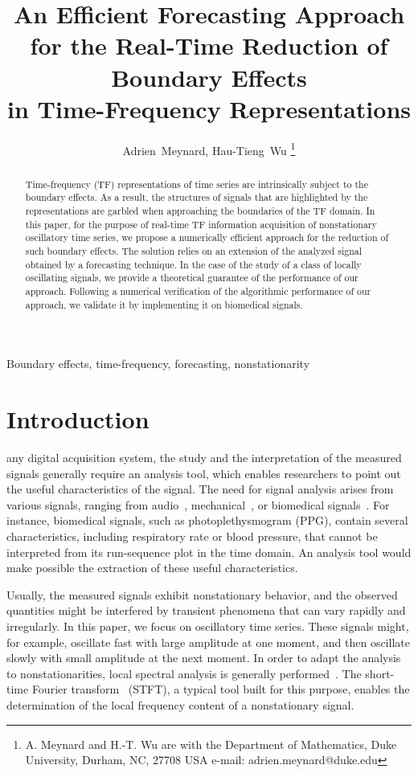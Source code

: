 \documentclass[journal]{IEEEtran}
\title{An Efficient Forecasting Approach for the Real-Time Reduction of Boundary Effects\\ in Time-Frequency Representations}
\author{Adrien~Meynard, %
        Hau-Tieng~Wu
\thanks{A. Meynard and H.-T. Wu are with the Department
of Mathematics, Duke University, Durham,
NC, 27708 USA e-mail: adrien.meynard@duke.edu}}
\begin{document}
\maketitle

\begin{abstract}
Time-frequency (TF) representations of time series are intrinsically subject to the boundary effects. As a result, the structures of signals that are highlighted by the representations are garbled when approaching the boundaries of the TF domain. In this paper, for the purpose of real-time TF information acquisition of nonstationary oscillatory time series, we propose a numerically efficient approach for the reduction of such boundary effects. The solution relies on an extension of the analyzed signal obtained by a forecasting technique. In the case of the study of a class of locally oscillating signals, we provide a theoretical guarantee of the performance of our approach. Following a numerical verification of the algorithmic performance of our approach, we validate it by implementing it on biomedical signals.
\end{abstract}

\begin{IEEEkeywords}
Boundary effects, time-frequency, forecasting, nonstationarity
\end{IEEEkeywords}

\section{Introduction}
\label{se:introduction}
 any digital acquisition system, the study and the interpretation of the measured signals generally require an analysis tool, which enables researchers to point out the useful characteristics of the signal. The need for signal analysis arises from various signals, ranging from audio~\cite{Stowell18computational,Muller11signal}, mechanical~\cite{Peng02vibration}, or biomedical signals~\cite{Akay96detection}. For instance, biomedical signals, such as photoplethysmogram (PPG), contain several characteristics, including respiratory rate or blood pressure, that cannot be interpreted from its run-sequence plot in the time domain. An analysis tool would make possible the extraction of these useful characteristics. 

Usually, the measured signals exhibit nonstationary behavior, and the observed quantities might be interfered by transient phenomena that can vary rapidly and irregularly. In this paper, we focus on oscillatory time series. These signals might, for example, oscillate fast with large amplitude at one moment, and then oscillate slowly with small amplitude at the next moment. In order to adapt the analysis to nonstationarities, local spectral analysis is generally performed~\cite{Stoica05spectral,Matz97generalized}. The short-time Fourier transform~\cite{Grochenig01foundations} (STFT), a typical tool built for this purpose, enables the determination of the local frequency content of a nonstationary signal.
\end{document}
